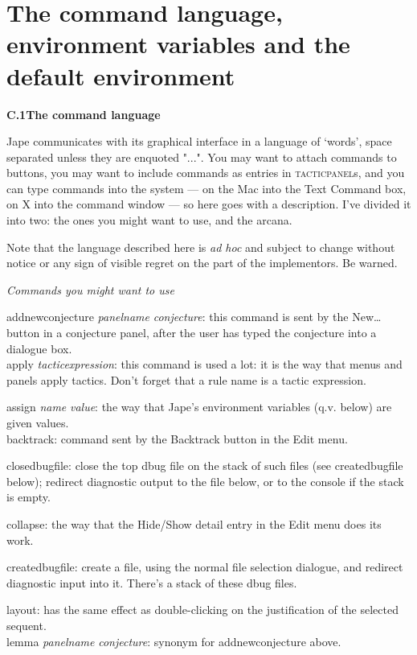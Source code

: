 \chapter{The command language, environment variables and the default environment}
\label{appx:GUIlang}


\textbf{{\large C.1\tab The command language}}


Jape communicates with its graphical interface in a language of `words', space separated unless they are enquoted "...". You may want to attach commands to buttons, you may want to include commands as entries in \textsc{tacticpanel}s, and you can type commands into the system --- on the Mac into the Text Command box, on X into the command window --- so here goes with a description. I've divided it into two: the ones you might want to use, and the arcana.


Note that the language described here is \textit{ad hoc} and subject to change without notice or any sign of visible regret on the part of the implementors. Be warned.


\textit{Commands you might want to use}


addnewconjecture \textit{panelname} \textit{conjecture}: this command is sent by the New\dots  button in a conjecture panel, after the user has typed the conjecture into a dialogue box.\\
apply \textit{tacticexpression}: this command is used a lot: it is the way that menus and panels apply tactics. Don't forget that a rule name is a tactic expression.


assign \textit{name} \textit{value}: the way that Jape's environment variables (q.v. below) are given values.\\
backtrack: command sent by the Backtrack button in the Edit menu.


closedbugfile: close the top dbug file on the stack of such files (see createdbugfile below); redirect diagnostic output to the file below, or to the console if the stack is empty.


collapse: the way that the Hide/Show detail entry in the Edit menu does its work.


createdbugfile: create a file, using the normal file selection dialogue, and redirect diagnostic input into it. There's a stack of these dbug files.


layout: has the same effect as double-clicking on the justification of the selected sequent.\\
lemma \textit{panelname} \textit{conjecture}: synonym for addnewconjecture above.



